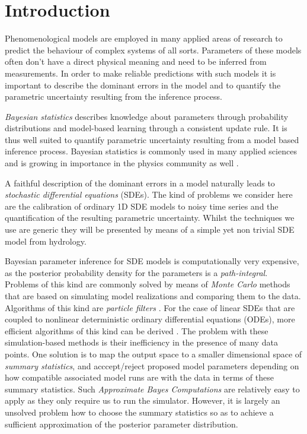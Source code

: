 \documentclass[12pt,a4paper,final]{iopart}
\begin{document}
\submitto{\NJP}

\section{Introduction}

Phenomenological models are employed in many applied areas of research to predict the behaviour of complex systems of all sorts.
Parameters of these models often don't have a direct physical meaning and need to be inferred from measurements.
In order to make reliable predictions with such models it is important to describe the dominant errors in the model and to quantify the parametric uncertainty resulting from the inference process.

{\em Bayesian statistics} describes knowledge about parameters through probability distributions and model-based learning through a consistent update rule. It is thus well suited to quantify parametric uncertainty resulting from a model based inference process.
Bayesian statistics is commonly used in many applied sciences and is growing in importance in the physics community as well \cite{vonToussaint_2011}.

A faithful description of the dominant errors in a model naturally leads to {\em stochastic differential equations} (SDEs).
The kind of problems we consider here are the calibration of ordinary 1D SDE models to noisy time series and the quantification of the resulting parametric uncertainty.
Whilst the techniques we use are generic they will be presented by means of a simple yet non trivial SDE model from hydrology.

Bayesian parameter inference for SDE models is computationally very expensive, as the posterior probability density for the parameters is a {\em path-integral}.
Problems of this kind are commonly solved by means of {\em Monte Carlo} methods that are based on simulating model realizations and comparing them to the data. Algorithms of this kind are {\em particle filters} \cite{chopin_2013_SMC2}. For the case of linear SDEs that are coupled to nonlinear deterministic ordinary differential equations (ODEs), more efficient algorithms of this kind can be derived \cite{tomassini_2009_smoothing, reichert_2009_timedepParameters}.
The problem with these simulation-based methods is their inefficiency in the presence of many data points.
One solution is to map the output space to a smaller dimensional space of {\em summary statistics}, and acccept/reject proposed model parameters depending on how compatible associated model runs are with the data in terms of these summary statistics.
Such {\em Approximate Bayes Computations} \cite{Albert_2014_ABC} are relatively easy to apply as they only require us to run the simulator. However, it is largely an unsolved problem how to choose the summary statistics so as to achieve a sufficient approximation of the posterior parameter distribution.
\end{document}
